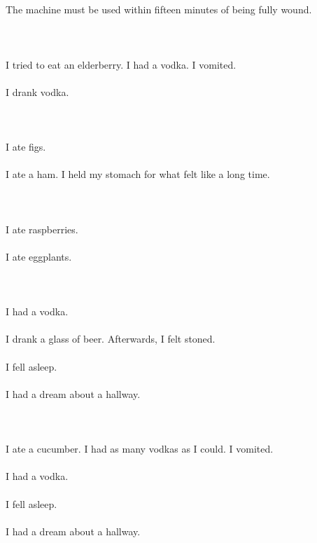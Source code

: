 \documentclass{article}
\begin{document}
    \section{}
    The machine must be used within fifteen minutes of being fully wound.\\\\ 
    \newpage
    
    \section{}
    I tried to eat an elderberry. I had a vodka. I vomited.\\\\I drank vodka.\\\\ 
    \newpage
    
    \section{}
    I ate figs.\\\\I ate a ham. I held my stomach for what felt like a long time.\\\\ 
    \newpage
    
    \section{}
    I ate raspberries.\\\\I ate eggplants.\\\\ 
    \newpage
    
    \section{}
    I had a vodka.\\\\I drank a glass of beer. Afterwards, I felt stoned.\\\\I fell asleep.\\\\I had a dream about a hallway.\\\\ 
    \newpage
    
    \section{}
    I ate a cucumber. I had as many vodkas as I could. I vomited.\\\\I had a vodka.\\\\I fell asleep.\\\\I had a dream about a hallway.\\\\ 
    \newpage
    
\end{document}

